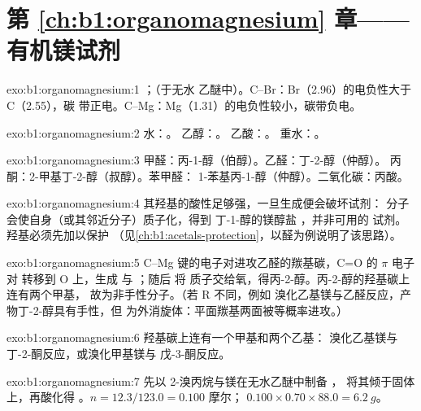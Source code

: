 \section*{第 \ref{ch:b1:organomagnesium} 章——有机镁试剂}

\begin{solution}{exo:b1:organomagnesium:1}
；（于无水
乙醚中）。C--Br：Br（2.96）的电负性大于 C（2.55），碳
带正电。C--Mg：Mg（1.31）的电负性较小，碳带负电。
\end{solution}

\begin{solution}{exo:b1:organomagnesium:2}
水：。
乙醇：。
乙酸：。
重水：。
\end{solution}

\begin{solution}{exo:b1:organomagnesium:3}
甲醛：丙-1-醇（伯醇）。乙醛：丁-2-醇（仲醇）。
丙酮：2-甲基丁-2-醇（叔醇）。苯甲醛：
1-苯基丙-1-醇（仲醇）。二氧化碳：丙酸。
\end{solution}

\begin{solution}{exo:b1:organomagnesium:4}
其羟基的酸性足够强，一旦生成便会破坏试剂：
分子会使自身（或其邻近分子）质子化，得到
丁-1-醇的镁醇盐 ，并非可用的
试剂。羟基必须先加以保护
（见\cref{ch:b1:acetals-protection}，以醛为例说明了该思路）。
\end{solution}

\begin{solution}{exo:b1:organomagnesium:5}
C--Mg 键的电子对进攻乙醛的羰基碳，C=O 的 $\pi$ 电子对
转移到 O 上，生成  与 ；随后  将
质子交给氧，得丙-2-醇。丙-2-醇的羟基碳上连有两个甲基，
故为非手性分子。（若 R 不同，例如
溴化乙基镁与乙醛反应，产物丁-2-醇具有手性，但
为外消旋体：平面羰基两面被等概率进攻。）
\end{solution}

\begin{solution}{exo:b1:organomagnesium:6}
羟基碳上连有一个甲基和两个乙基：
溴化乙基镁与丁-2-酮反应，或溴化甲基镁与
戊-3-酮反应。
\end{solution}

\begin{solution}{exo:b1:organomagnesium:7}
先以 2-溴丙烷与镁在无水乙醚中制备 ，
将其倾于固体  上，再酸化得 。$n = 12.3/123.0 = 0.100$ 摩尔；
$0.100 \times 0.70 \times 88.0 = \qty{6.2}{g}$。
\end{solution}

